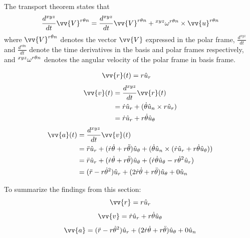 \documentclass{article}
\begin{document}
The transport theorem states that
$$\frac{d^{xyz}}{dt}{\vv{V}^{r\theta{}n}}=\frac{d^{xyz}}{dt}{\vv{V}^{r\theta{}n}}+\prescript{xyz}{}{\omega}^{r\theta{}n}\times{}\vv{u}^{r\theta{}n}$$
where $\vv{V}^{r\theta{}n}$ denotes the vector $\vv{V}$ expressed in the polar frame, $\frac{d^{xyz}}{dt}$ and $\frac{d^{r\theta{}n}}{dt}$ denote the time derivatives in the basis and polar frames respectively, and $\prescript{xyz}{}{\omega}^{r\theta{}n}$ denotes the angular velocity of the polar frame in basis frame.

\begin{align*}
    \vv{r}(t) & =r\hat{u}_r
\end{align*}
\begin{align*}
    \vv{v}(t) & =\frac{d^{xyz}}{dt}\vv{r}(t)                                \\
              & =\dot{r}\hat{u}_r+(\dot{\theta}\hat{u}_n\times{}r\hat{u}_r) \\
              & =\dot{r}\hat{u}_r+r\dot{\theta}\hat{u}_\theta
\end{align*}
\begin{align*}
    \vv{a}(t) & =\frac{d^{xyz}}{dt}\vv{v}(t)                                                                                                                      \\
              & =\ddot{r}\hat{u}_r+(\dot{r}\dot{\theta}+r\ddot{\theta})\hat{u}_\theta+(\dot{\theta}\hat{u}_n\times(\dot{r}\hat{u}_r+r\dot{\theta}\hat{u}_\theta)) \\
              & =\ddot{r}\hat{u}_r+(\dot{r}\dot{\theta}+r\ddot{\theta})\hat{u}_\theta+(\dot{r}\dot{\theta}\hat{u}_\theta-r\dot{\theta}^2\hat{u}_r)                \\
              & =(\ddot{r}-r\dot{\theta}^2)\hat{u}_r+(2\dot{r}\dot{\theta}+r\ddot{\theta})\hat{u}_\theta+0\hat{u}_n                                               \\
\end{align*}

To summarize the findings from this section:
\begin{equation}\label{Position}
    \vv{r}=r\hat{u}_r
\end{equation}
\begin{equation}\label{Velocity}
    \vv{v}=\dot{r}\hat{u}_r+r\dot{\theta}\hat{u}_\theta
\end{equation}
\begin{equation}\label{Acceleration}
    \vv{a}=(\ddot{r}-r\dot{\theta}^2)\hat{u}_r+(2\dot{r}\dot{\theta}+r\ddot{\theta})\hat{u}_\theta+0\hat{u}_n
\end{equation}
\end{document}
